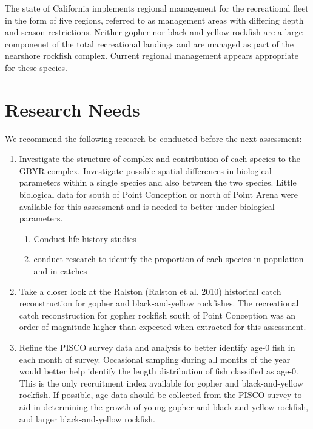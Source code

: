 \documentclass[12pt,]{article}
\begin{document}
The state of California implements regional management for the
recreational fleet in the form of five regions, referred to as
management areas with differing depth and season restrictions. Neither
gopher nor black-and-yellow rockfish are a large componenet of the total
recreational landings and are managed as part of the nearshore rockfish
complex. Current regional management appears appropriate for these
species.

\section{Research Needs}\label{research-needs}

We recommend the following research be conducted before the next
assessment:

\begin{enumerate}

\item Investigate the structure of complex and contribution of each species to the 
GBYR complex. Investigate possible spatial differences in biological parameters within 
a single species and also between the two species.  Little biological data for south of 
Point Conception or north of Point Arena were available for this assessment and is needed 
to better under biological parameters. 
    \begin{enumerate}
     \item Conduct life history studies
     \item conduct research to identify the proportion of each species in population and in catches
    \end{enumerate}

\item Take a closer look at the Ralston (Ralston et al. 2010) historical catch reconstruction 
for gopher and black-and-yellow rockfishes.  The recreational catch reconstruction for 
gopher rockfish south of Point Conception was an order of magnitude higher than expected 
when extracted for this assessment.  

\item Refine the PISCO survey data and analysis to better identify age-0 fish in each 
month of survey.  Occasional sampling during all months of the year would better help 
identify the length distribution of fish classified as age-0. This is the only recruitment 
index available for gopher and black-and-yellow rockfish. If possible, age data should be 
collected from the PISCO survey to aid in determining the growth of young gopher and 
black-and-yellow rockfish, and larger black-and-yellow rockfish.


\end{enumerate}
\end{document}
